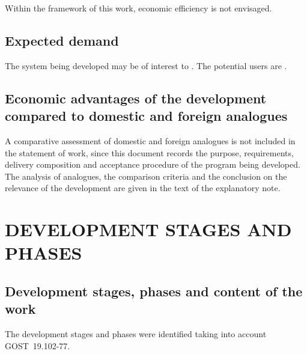 \documentclass[12pt,a4paper]{extarticle}
\begin{document}
Within the framework of this work, economic efficiency is not envisaged.

\subsection{Expected demand}

The system being developed may be of interest to . The potential users are .

\subsection{Economic advantages of the development compared to domestic and foreign analogues}

A comparative assessment of domestic and foreign analogues is not included in the statement of work, since this document records the purpose, requirements, delivery composition and acceptance procedure of the program being developed. The analysis of analogues, the comparison criteria and the conclusion on the relevance of the development are given in the text of the explanatory note.

\clearpage

\section{DEVELOPMENT STAGES AND PHASES}

\subsection{Development stages, phases and content of the work}

The development stages and phases were identified taking into account GOST~19.102-77\cite{gost19102}.
\end{document}
